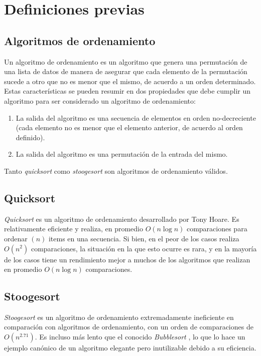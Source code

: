 \documentclass[a4paper,11pt]{article}
\begin{document}
\section{Definiciones previas}

\subsection{Algoritmos de ordenamiento}

Un algoritmo de ordenamiento es un algoritmo que genera una permutación de una
lista de datos de manera de asegurar que cada elemento de la permutación sucede
a otro que no es menor que el mismo, de acuerdo a un orden determinado. Estas
características se pueden resumir en dos propiedades que debe cumplir un
algoritmo para ser considerado un algoritmo de ordenamiento:

\begin{enumerate}

  \item La salida del algoritmo es una secuencia de elementos en orden
    no-decreciente (cada elemento no es menor que el elemento anterior, de
    acuerdo al orden definido).

  \item La salida del algoritmo es una permutación de la entrada del mismo.

\end{enumerate}

Tanto \textit{quicksort} como \textit{stoogesort} son algoritmos de
ordenamiento válidos.

\subsection{Quicksort}

\textit{Quicksort} es un algoritmo de ordenamiento desarrollado por Tony Hoare.
Es relativamente eficiente y realiza, en promedio \(O(n\log{n})\) comparaciones
para ordenar \((n)\) items en una secuencia. Si bien, en el peor de los casos
realiza \(O(n^2)\) comparaciones, la situación en la que esto ocurre es rara, y
en la mayoría de los casos tiene un rendimiento mejor a muchos de los
algoritmos que realizan en promedio \(O(n\log{n})\) comparaciones.

\subsection{Stoogesort}\label{sec:introstooge}

\textit{Stoogesort} es un algoritmo de ordenamiento extremadamente ineficiente
en comparación con algoritmos de ordenamiento, con un orden de comparaciones de
\(O(n^{2.71})\). Es incluso más lento que el conocido \textit{Bubblesort}
\cite{WIKIBUB}, lo que lo hace un ejemplo canónico de un algoritmo elegante
pero inutilizable debido a su eficiencia.
\end{document}
